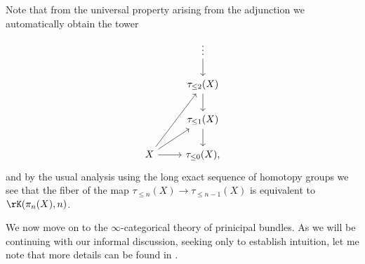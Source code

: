 \begin{nothing}
\begin{subremark}
    Note that from the universal property arising from the adjunction we automatically obtain the tower
    \[
      \begin{tikzcd}
        & \vdots \ar[d] \\
        & \tau_{\le 2}(X) \ar[d] \\
        & \tau_{\le 1}(X) \ar[d] \\
        X \ar[r] \ar[ur] \ar[uur] & \tau_{\le 0}(X),
      \end{tikzcd}
    \]
    and by the usual analysis using the long exact sequence of homotopy groups we see that the fiber of the map $\tau_{\le n}(X) \to \tau_{\le n-1}(X)$ is equivalent to $\rK(\pi_n(X),n)$.
  \end{subremark}
\end{nothing}

We now move on to the $\infty$-categorical theory of prinicipal bundles. As we will be continuing with our informal discussion, seeking only to establish intuition, let me note that more details can be found in \cite{nikolaus-bundles-general}.

